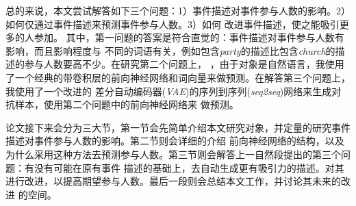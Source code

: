 \par{
    总的来说，本文尝试解答如下三个问题：1）事件描述对事件参与人数的影响。2）如何仅通过事件描述来预测事件参与人数。3）如何
    改进事件描述，使之能吸引更多的人参加。 其中，第一问题的答案是符合直觉的：事件描述对事件参与人数有影响，而且影响程度与
    不同的词语有关，例如包含\textit{party}的描述比包含\textit{church}的描述的参与人数要高不少。在研究第二个问题上，
    ，由于对象是自然语言，我使用了一个经典的带卷积层的前向神经网络和词向量来做预测。在解答第三个问题上，我使用了一个改进的
    差分自动编码器(\textit{VAE})的序列到序列(\textit{seq2seq})网络来生成对抗样本，使用第二个问题中的前向神经网络来
    做预测。
}

\par{
    论文接下来会分为三大节，第一节会先简单介绍本文研究对象，并定量的研究事件描述对事件参与人数的影响。第二节则会详细的介绍
    前向神经网络的结构，以及为什么采用这种方法去预测参与人数。第三节则会解答上一自然段提出的第三个问题：有没有可能在原有事件
    描述的基础上，去自动生成更有吸引力的描述。对其进行改进，以提高期望参与人数。最后一段则会总结本文工作，并讨论其未来的改进
    的空间。
}
   
